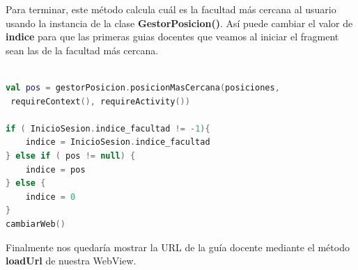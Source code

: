 \documentclass[a4paper,11pt]{article}
\begin{document}
\vspace{5 mm}

Para terminar, este método calcula cuál es la facultad más cercana al usuario usando la instancia de la clase \textbf{GestorPosicion()}. Así puede cambiar el valor de \textbf{indice} para que las primeras guias docentes que veamos al iniciar el fragment sean las de la facultad más cercana.

\vspace{5 mm}

\begin{lstlisting}[language=Kotlin]

val pos = gestorPosicion.posicionMasCercana(posiciones,
 requireContext(), requireActivity())

if ( InicioSesion.indice_facultad != -1){
	indice = InicioSesion.indice_facultad
} else if ( pos != null) {
	indice = pos
} else {
	indice = 0
}
cambiarWeb()

\end{lstlisting}

\vspace{5 mm}

\vspace{5 mm}

Finalmente nos quedaría mostrar la URL de la guía docente mediante el método \textbf{loadUrl} de nuestra WebView.

\newpage
\end{document}
